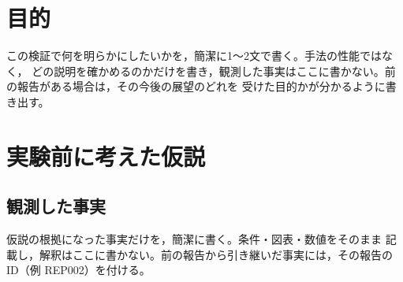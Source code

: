 \documentclass[twocolumn, 10pt]{ujarticle}
\begin{document}
\beginverification

\section{目的}\label{sec:purpose}

この検証で何を明らかにしたいかを，簡潔に1〜2文で書く。手法の性能ではなく，
どの説明を確かめるのかだけを書き，観測した事実はここに書かない。前の報告がある場合は，その今後の展望のどれを
受けた目的かが分かるように書き出す。

\section{実験前に考えた仮説}\label{sec:prehyp}

\subsection{観測した事実}\label{sec:fact}

仮説の根拠になった事実だけを，簡潔に書く。条件・図表・数値をそのまま
記載し，解釈はここに書かない。前の報告から引き継いだ事実には，その報告のID（例 REP002）を付ける。


\end{document}
